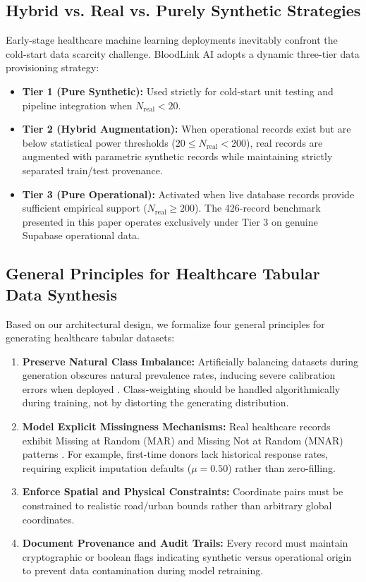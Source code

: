 \documentclass[conference]{IEEEtran}
\begin{document}
\subsection{Hybrid vs. Real vs. Purely Synthetic Strategies}
Early-stage healthcare machine learning deployments inevitably confront the cold-start data scarcity challenge. BloodLink AI adopts a dynamic three-tier data provisioning strategy:
\begin{itemize}
    \item \textbf{Tier 1 (Pure Synthetic):} Used strictly for cold-start unit testing and pipeline integration when $N_{\text{real}} < 20$.
    \item \textbf{Tier 2 (Hybrid Augmentation):} When operational records exist but are below statistical power thresholds ($20 \le N_{\text{real}} < 200$), real records are augmented with parametric synthetic records while maintaining strictly separated train/test provenance.
    \item \textbf{Tier 3 (Pure Operational):} Activated when live database records provide sufficient empirical support ($N_{\text{real}} \ge 200$). The 426-record benchmark presented in this paper operates exclusively under Tier 3 on genuine Supabase operational data.
\end{itemize}

\subsection{General Principles for Healthcare Tabular Data Synthesis}
Based on our architectural design, we formalize four general principles for generating healthcare tabular datasets:
\begin{enumerate}
    \item \textbf{Preserve Natural Class Imbalance:} Artificially balancing datasets during generation obscures natural prevalence rates, inducing severe calibration errors when deployed \cite{provost2001robust}. Class-weighting should be handled algorithmically during training, not by distorting the generating distribution.
    \item \textbf{Model Explicit Missingness Mechanisms:} Real healthcare records exhibit Missing at Random (MAR) and Missing Not at Random (MNAR) patterns \cite{little2019missing}. For example, first-time donors lack historical response rates, requiring explicit imputation defaults ($\mu = 0.50$) rather than zero-filling.
    \item \textbf{Enforce Spatial and Physical Constraints:} Coordinate pairs must be constrained to realistic road/urban bounds rather than arbitrary global coordinates.
    \item \textbf{Document Provenance and Audit Trails:} Every record must maintain cryptographic or boolean flags indicating synthetic versus operational origin to prevent data contamination during model retraining.
\end{enumerate}
\end{document}
